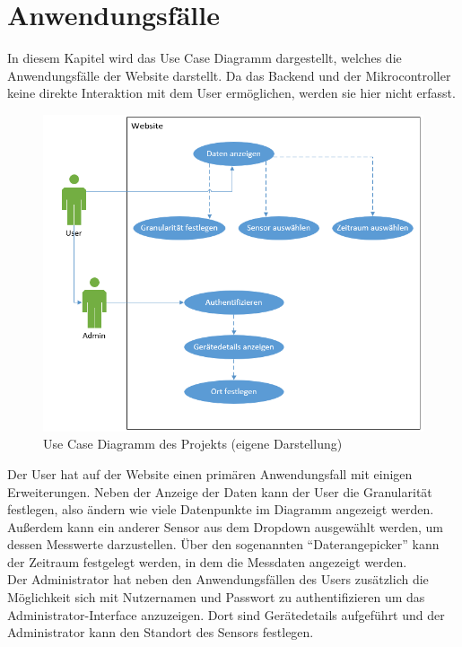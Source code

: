 \section{Anwendungsfälle}
In diesem Kapitel wird das Use Case Diagramm dargestellt, welches die Anwendungsfälle der Website darstellt.
Da das Backend und der Mikrocontroller keine direkte Interaktion mit dem User ermöglichen, werden sie hier nicht erfasst.\\
\begin{figure}[h]
    \centering
    \includegraphics[width=0.7\linewidth]{img/usecase}
    \caption[Use Case Diagramm des Projekts]{Use Case Diagramm des Projekts (eigene Darstellung)}
    \label{fig:usecase}
\end{figure}

Der User hat auf der Website einen primären Anwendungsfall mit einigen Erweiterungen.
Neben der Anzeige der Daten kann der User die Granularität festlegen, also ändern wie viele Datenpunkte im Diagramm angezeigt werden.
Außerdem kann ein anderer Sensor aus dem Dropdown ausgewählt werden, um dessen Messwerte darzustellen.
Über den sogenannten \enquote{Daterangepicker} kann der Zeitraum festgelegt werden, in dem die Messdaten angezeigt werden. \\
Der Administrator hat neben den Anwendungsfällen des Users zusätzlich die Möglichkeit sich mit Nutzernamen und Passwort zu authentifizieren um das Administrator-Interface anzuzeigen.
Dort sind Gerätedetails aufgeführt und der Administrator kann den Standort des Sensors festlegen.